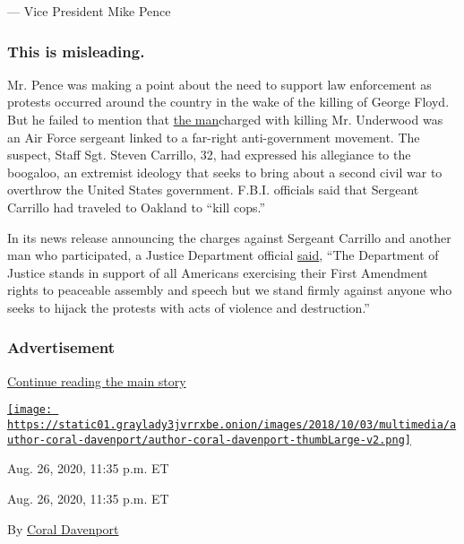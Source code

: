 --- Vice President Mike Pence

\hypertarget{this-is-misleading-1}{%
\subsubsection{This is misleading.}\label{this-is-misleading-1}}

Mr. Pence was making a point about the need to support law enforcement
as protests occurred around the country in the wake of the killing of
George Floyd. But he failed to mention that
\href{https://slack-redir.net/link?url=https\%3A\%2F\%2Fwww.nytimes3xbfgragh.onion\%2F2020\%2F06\%2F16\%2Fus\%2Fsteven-carrillo-air-force-boogaloo.html}{the
man}charged with killing Mr. Underwood was an Air Force sergeant linked
to a far-right anti-government movement. The suspect, Staff Sgt. Steven
Carrillo, 32, had expressed his allegiance to the boogaloo, an extremist
ideology that seeks to bring about a second civil war to overthrow the
United States government. F.B.I. officials said that Sergeant Carrillo
had traveled to Oakland to ``kill cops.''

In its news release announcing the charges against Sergeant Carrillo and
another man who participated, a Justice Department official
\href{https://slack-redir.net/link?url=https\%3A\%2F\%2Fwww.justice.gov\%2Fopa\%2Fpr\%2Ftwo-defendants-charged-murder-and-aiding-and-abetting-slaying-federal-protective-service}{said},
``The Department of Justice stands in support of all Americans
exercising their First Amendment rights to peaceable assembly and speech
but we stand firmly against anyone who seeks to hijack the protests with
acts of violence and destruction.''

\hypertarget{advertisement}{%
\subsubsection{Advertisement}\label{advertisement}}

\protect\hyperlink{after-dfp-ad-mid1}{Continue reading the main story}

\href{https://www.nytimes3xbfgragh.onion/by/coral-davenport}{\texttt{[image: https://static01.graylady3jvrrxbe.onion/images/2018/10/03/multimedia/author-coral-davenport/author-coral-davenport-thumbLarge-v2.png]}}

Aug. 26, 2020, 11:35 p.m. ET

Aug. 26, 2020, 11:35 p.m. ET

By \href{https://www.nytimes3xbfgragh.onion/by/coral-davenport}{Coral
Davenport}

